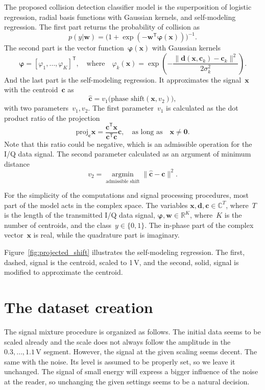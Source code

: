 \documentclass[12pt]{article}
\newcommand{\bw}{\mathbf{w}}
\newcommand{\bwT}{\mathbf{w}^\mathsf{T}}
\newcommand{\T}{^\mathsf{T}}
\newcommand{\bphi}{\boldsymbol{\varphi}}
\newcommand{\bx}{\mathbf{x}}
\newcommand{\bc}{\mathbf{c}}
\newcommand{\bd}{\mathbf{d}}
\begin{document}
The proposed collision detection classifier model is the superposition of logistic regression, radial basis functions with Gaussian kernels, and self-modeling regression. The first part returns the probability of collision as
\[
p(y|\bw) =\bigl( 1+\exp(-\bwT\bphi(\bx)) \bigr)^{-1}.
\]
The second part is the vector function~$\bphi(\bx)$ with Gaussian kernels 
\[
\bphi = [\varphi_1,\ldots,\varphi_K]\T, \quad \text{where} \quad \varphi_k(\bx) =  \exp\left(-\frac{\|\bd(\bx, \bc_k) - \bc_k\|^2}{2\sigma_k^2}\right).
\]
And the last part is the self-modeling regression. It approximates the signal~$\bx$ with the centroid~$\bc$ as
\[
\hat{\bc} = v_1 \bigl( \text{phase shift}(\bx, v_2)\bigr),
\]  
with two parameters~$v_1,v_2$. The first parameter~$v_1$ is calculated as the dot product ratio of the projection 
\[
\text{proj}_\bc \bx = \frac{\bc\T\bx}{\bc\T\bc}\bc, \quad \text{as long as} \quad \bx \neq \boldsymbol{0}.
\]
Note that this ratio could be negative, which is an admissible operation for the I/Q data signal. The second parameter calculated as an argument of minimum distance
\[v_2 =\mathop{\arg\min}\limits_{\text{admissible shift}}\|\hat{\bc}-\bc\|^2.\]

For the simplicity of the computations and signal processing procedures, most part of the model acts in the complex space. The variables $\bx, \bd, \bc \in \mathbb{C}^T$,
where~$T$ is the length of the transmitted I/Q data signal, 
$\bphi, \bw \in \mathbb{R}^K$,
where~$K$ is the number of centroids, and the class~$y\in\{0,1\}.$ The in-phase part of the complex vector~$\bx$ is real, while the quadrature part is imaginary.

Figure~\ref{fig:projected_shift} illustrates the self-modeling regression. The first, dashed, signal is the centroid, scaled to 1\,V, and the second, solid, signal is modified to approximate the centroid.

\section{The dataset creation}
The signal mixture procedure is organized as follows. The initial data seems to be scaled already and the scale does not always follow the amplitude in the $0.3,\ldots,1.1$\,V segment. However, the signal at the given scaling seems decent. The same with the noise. Its level is assumed to be properly set, so we leave it unchanged. The signal of small energy will express a bigger influence of the noise at the reader, so unchanging the given settings seems to be a natural decision. 
 
\end{document}

